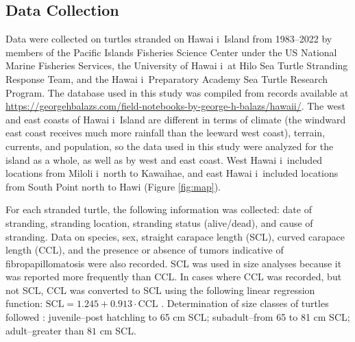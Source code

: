 \documentclass[sn-basic,NameDate]{sn-jnl}\usepackage[]{graphicx}\usepackage[]{xcolor}
\DeclareRobustCommand{\okina}{%
  \raisebox{\dimexpr\fontcharht\font`A-\height}{%
    \scalebox{0.8}{`}%
  }%
}
\newcommand{\Hawaii}{Hawai\okina i}
\newcommand{\Milolii}{Miloli\okina i}
\begin{document}
\subsection{Data Collection}
Data were collected on turtles stranded on \Hawaii\ Island from 1983--2022 by members of the Pacific Islands Fisheries Science Center under the US National Marine Fisheries Services, the University of \Hawaii\ at Hilo Sea Turtle Stranding Response Team, and the \Hawaii\ Preparatory Academy Sea Turtle Research Program. 
The database used in this study was compiled from records available at \url{https://georgehbalazs.com/field-notebooks-by-george-h-balazs/hawaii/}. 
The west and east coasts of \Hawaii\ Island are different in terms of climate (the windward east coast receives much more rainfall than the leeward west coast), terrain, currents, and population, so the data used in this study were analyzed for the island as a whole, as well as by west and east coast. 
West \Hawaii\ included locations from \Milolii\ north to Kawaihae, and east \Hawaii\ included locations from South Point north to Hawi (Figure \ref{fig:map}). 

For each stranded turtle, the following information was collected: date of stranding, stranding location, stranding status (alive/dead), and cause of stranding. Data on species, sex, straight carapace length (SCL), curved carapace length (CCL), and the presence or absence of tumors indicative of fibropapillomatosis were also recorded. SCL was used in size analyses because it was reported more frequently than CCL. In cases where CCL was recorded, but not SCL, CCL was converted to SCL using the following linear regression function: $\text{SCL} = 1.245 +0.913\cdot\text{CCL}$ \citep{chaloupka2008cause}. Determination of size classes of turtles followed \cite{balazs1980synopsis}: juvenile--post hatchling to 65 cm SCL; subadult--from 65 to 81 cm SCL; adult--greater than $81$ cm SCL. 
\end{document}
